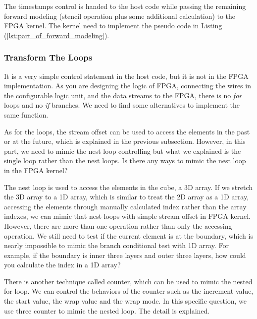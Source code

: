 \begin{figure}
  \centering
  
\end{figure}

The timestamps control is handed to the host code while passing the
remaining forward modeling (stencil operation plus some additional
calculation) to the FPGA kernel. The kernel need to implement the pseudo
code in Listing (\ref{lst:part_of_forward_modeling}).


\subsubsection{Transform The Loops} %
\label{ssub:Transform the lo}
It is a very simple control statement in the host code, but it is not in
the FPGA implementation. As you are designing the logic of FPGA, connecting
the wires in the configurable logic unit, and the data streams to the FPGA,
there is no \emph{for} loops and no \emph{if} branches. We need to find
some alternatives to implement the same function.

As for the loops, the stream offset can be used to access the elements
in the past or at the future, which is explained in  the previous
subsection. However, in this part, we need to mimic the nest loop
controlling but what we explained is the single loop rather than the
nest loops. Is there any ways to mimic the nest loop in the FPGA kernel?

The nest loop is used to access the elements in the cube, a 3D array. If we
stretch the 3D array to a 1D array, which is similar to treat the 2D array
as a 1D array, accessing the elements through manually calculated index
rather than the array indexes, we can mimic that nest loops with simple
stream offset in FPGA kernel. However, there are more than one operation
rather than only the accessing operation. We still need to test if the
current element is at the boundary, which is nearly impossible to mimic the
branch conditional test with 1D array. For example, if the boundary is
inner three layers and outer three layers, how could you calculate the
index in a 1D array?

There is another technique called counter, which can be used to mimic the
nested for loop. We can control the behaviors of the counter such as the
increment value, the start value, the wrap value and the wrap mode. In this
specific question, we use three counter to mimic the nested loop. The
detail is explained.

